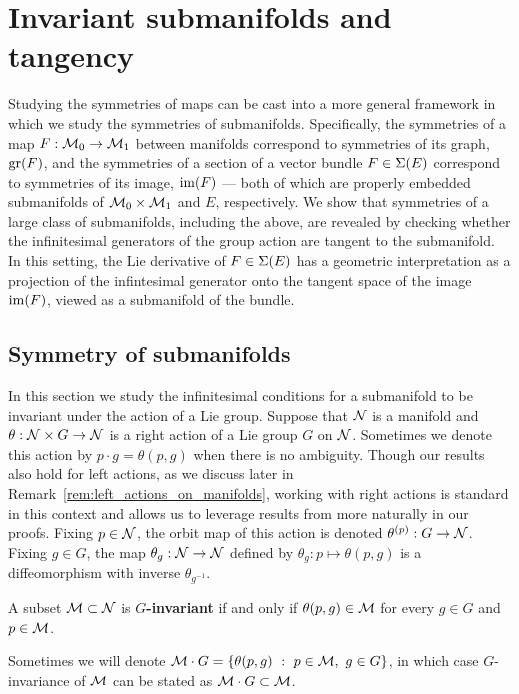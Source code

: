 \documentclass[twoside,11pt]{article}
\begin{document}
\section{Invariant submanifolds and tangency}
\label{sec:submanifolds_and_tangency}
Studying the symmetries of maps can be cast into a more general framework in which we study the symmetries of submanifolds.
Specifically, the symmetries of a map $F: {\mathcal{M}}_0 \to {\mathcal{M}}_1$ between manifolds correspond to symmetries of its graph, $\operatorname{gr}(F)$, 
and the symmetries of a section of a vector bundle $F \in \operatorname{\Sigma}(E)$ correspond to symmetries of its image, $\operatorname{im}(F)$ 
--- both of which are properly embedded submanifolds of ${\mathcal{M}}_0 \times {\mathcal{M}}_1$ and $E$, respectively.
We show that symmetries of 
a large class of submanifolds, including the above,
are revealed by checking whether the infinitesimal generators of the group action are tangent to the submanifold.
In this setting, the Lie derivative of $F\in\operatorname{\Sigma}(E)$ has a geometric interpretation as a projection of the infintesimal generator onto the tangent space of the image $\operatorname{im}(F)$, viewed as a submanifold of the bundle.

\subsection{Symmetry of submanifolds}
\label{subsec:detecting_symmetry_of_submanifolds}
In this section we study the infinitesimal conditions for a submanifold to be invariant under the action of a Lie group.
Suppose that ${\mathcal{N}}$ is a manifold and $\theta: {\mathcal{N}}\times G \to {\mathcal{N}}$ is a right action of a Lie group $G$ on ${\mathcal{N}}$.
Sometimes we denote this action by $p\cdot g = \theta(p,g)$ when there is no ambiguity.
Though our results also hold for left actions, as we discuss later in Remark~\ref{rem:left_actions_on_manifolds}, working with right actions is standard in this context and allows us to leverage results from \citet{Lee2013introduction} more naturally in our proofs.
Fixing $p\in{\mathcal{N}}$, the orbit map of this action is denoted $\theta^{(p)}:G\to {\mathcal{N}}$.
Fixing $g\in G$, the map $\theta_g:{\mathcal{N}}\to {\mathcal{N}}$ defined by $\theta_g: p \mapsto \theta(p,g)$ is a diffeomorphism with inverse $\theta_{g^{-1}}$.
\begin{definition}
    \label{def:group_invariance_of_subset}
    A subset ${\mathcal{M}} \subset {\mathcal{N}}$ is \textbf{$G$-invariant} if and only if $\theta(p, g) \in {\mathcal{M}}$ for every $g\in G$ and $p\in{\mathcal{M}}$.
\end{definition}
\noindent
Sometimes we will denote ${\mathcal{M}} \cdot G = \{ \theta(p, g) \ : \ p \in {\mathcal{M}}, \ g\in G \}$, in which case $G$-invariance of ${\mathcal{M}}$ can be stated as ${\mathcal{M}} \cdot G \subset {\mathcal{M}}$.
\end{document}
